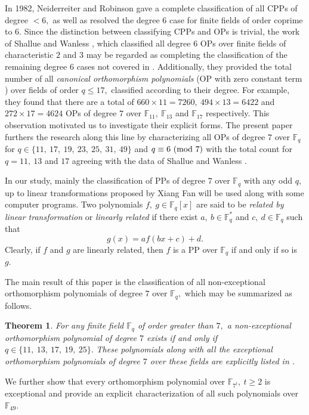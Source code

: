 \documentclass[12pt,a4wide, reqno]{amsart}
\newtheorem{theorem}{Theorem}[section]
\theoremstyle{definition}
\theoremstyle{remark}
\numberwithin{equation}{section}
\begin{document}
In 1982, Neiderreiter and Robinson \cite{CPP1} gave a complete classification of all CPPs of degree $<6,$ as well as resolved the degree $6$ case for finite fields of order coprime to $6.$ Since the distinction between classifying CPPs and OPs is trivial, the work of Shallue and Wanless \cite{shallue}, which classified all degree $6$ OPs over finite fields of characteristic $2$ and $3$ may be regarded as completing the classification of the remaining degree $6$ cases not covered in \cite{CPP1}. Additionally, they provided the total number of all \textit{canonical orthomorphism polynomials} (OP with zero constant term \cite{wanless2}) over fields of order $q\leq 17,$ classified according to their degree. For example, they found that there are a total of $660\times 11=7260,~494 \times 13=6422$ and $272 \times 17=4624$ OPs of degree $7$ over $\mathbb{F}_{11},~\mathbb{F}_{13}$ and $\mathbb{F}_{17}$ respectively. This observation motivated us to investigate their explicit forms. The present paper furthers the research along this line by characterizing all OPs of degree $7$ over $\mathbb{F}_q$ for $q\in\{11,~17,~19,~23,~25,~31,~49\}$ and $q\equiv 6~(\textup{mod}~7)$ with the total count for $q=11,~13$ and $17$ agreeing with the data of Shallue and Wanless \cite{shallue}.

In our study, mainly the classification of PPs of degree $7$ over $\mathbb{F}_q$ with any odd $q,$ up to linear transformations proposed by Xiang Fan \cite{xfan} will be used along with some computer programs. Two polynomials $f,~g\in \mathbb{F}_q[x]$ are said to be \textit{related by linear transformation} or \textit{linearly related} if there exist $a,~b\in \mathbb{F}_q^*$ and $c,~d\in \mathbb{F}_q$ such that $$g(x)=af(bx+c)+d.$$
Clearly, if $f$ and $g$ are linearly related, then $f$ is a PP over $\mathbb{F}_q$ if and only if so is $g.$ 

The main result of this paper is the classification of all non-exceptional orthomorphism polynomials of degree $7$ over $\mathbb{F}_q,$ which may be summarized as follows.
\begin{theorem}
    For any finite field $\mathbb{F}_q$ of order greater than $7,$ a non-exceptional orthomorphism polynomial of degree $7$ exists if and only if $q\in\{11,~13,~17,~19,~25\}.$ These polynomials along with all the exceptional orthomorphism polynomials of degree $7$ over these fields are explicitly listed in .
    \end{theorem}
    We further show that every orthomorphism polynomial over $\mathbb{F}_{7^t},~t\geq 2$  is exceptional and provide an explicit characterization of all such polynomials over $\mathbb{F}_{49}.$
\end{document}
